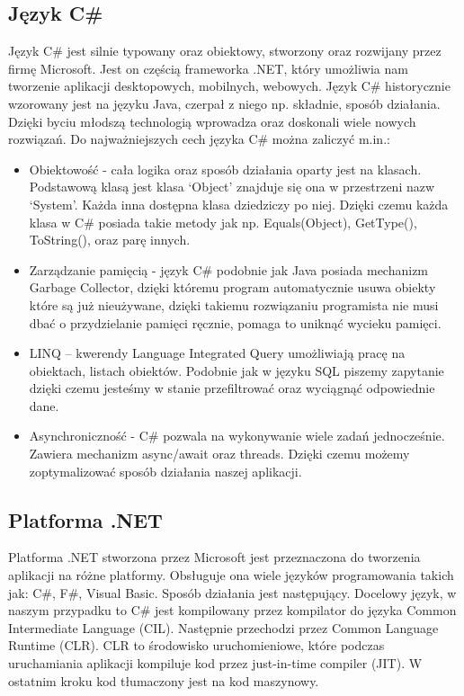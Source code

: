\documentclass[a4paper,twoside,12pt]{book}
\begin{document}
\subsection{Język C\#}
Język C\# jest silnie typowany oraz obiektowy, stworzony oraz rozwijany przez firmę Microsoft. Jest on częścią frameworka .NET, który umożliwia nam tworzenie aplikacji desktopowych, mobilnych, webowych.  Język C\# historycznie wzorowany jest na języku Java, czerpał z niego np. składnie, sposób działania. Dzięki byciu młodszą technologią wprowadza oraz doskonali wiele nowych rozwiązań.  
Do najważniejszych cech języka C\# można zaliczyć m.in.: 
\begin{itemize}
    \item Obiektowość - cała logika oraz sposób działania oparty jest na klasach. Podstawową klasą jest klasa ‘Object’ znajduje się ona w przestrzeni nazw ‘System’. Każda inna dostępna klasa dziedziczy po niej. Dzięki czemu każda klasa w C\# posiada takie metody jak np. Equals(Object), GetType(), ToString(), oraz parę innych. 
    \item Zarządzanie pamięcią - język C\# podobnie jak Java posiada mechanizm Garbage Collector, dzięki któremu program automatycznie usuwa obiekty które są już nieużywane, dzięki takiemu rozwiązaniu programista nie musi dbać o przydzielanie pamięci ręcznie, pomaga to uniknąć wycieku pamięci. 
    \item LINQ – kwerendy Language Integrated Query umożliwiają pracę na obiektach, listach obiektów. Podobnie jak w języku SQL piszemy zapytanie dzięki czemu jesteśmy w stanie przefiltrować oraz wyciągnąć odpowiednie dane.  
    \item Asynchroniczność - C\# pozwala na wykonywanie wiele zadań jednocześnie. Zawiera mechanizm async/await oraz threads. Dzięki czemu możemy zoptymalizować sposób działania naszej aplikacji. 
\end{itemize}

\subsection{Platforma .NET}
Platforma .NET stworzona przez Microsoft jest przeznaczona do tworzenia aplikacji na różne platformy. Obsługuje ona wiele języków programowania takich jak: C\#, F\#, Visual Basic. Sposób działania jest następujący. Docelowy język, w naszym przypadku to C\# jest kompilowany przez kompilator do języka Common Intermediate Language (CIL). Następnie przechodzi przez Common Language Runtime (CLR). CLR to środowisko uruchomieniowe, które podczas uruchamiania aplikacji kompiluje kod przez just-in-time compiler (JIT). W ostatnim kroku kod tłumaczony jest na kod maszynowy. 
\end{document}
